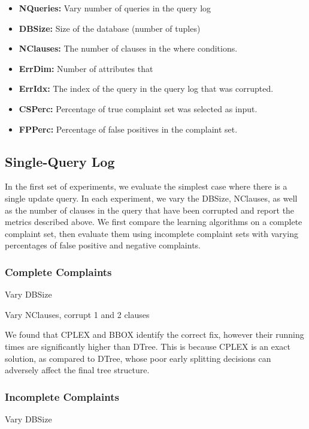 \begin{itemize}
\item {\bf NQueries:} Vary number of queries in the query log
\item {\bf DBSize: } Size of the database (number of tuples)
\item {\bf NClauses:} The number of clauses in the where conditions.
\item {\bf ErrDim: } Number of attributes that 
\item {\bf ErrIdx: } The index of the query in the query log that was corrupted.
\item {\bf CSPerc: } Percentage of true complaint set was selected as input.
\item {\bf FPPerc: } Percentage of false positives in the complaint set.
\end{itemize}


\subsection{Single-Query Log}

In the first set of experiments, we evaluate the simplest case where there
is a single update query.  In each experiment, we vary the DBSize,
NClauses, as well as the number of clauses in the query that have
been corrupted and report the metrics described above.  We first 
compare the learning algorithms on a complete complaint set, then evaluate them
using incomplete complaint sets with varying percentages of false positive and negative complaints.

\subsubsection{Complete Complaints}

Vary DBSize

Vary NClauses, corrupt 1 and 2 clauses

We found that CPLEX and BBOX identify the correct fix, however their
running times are significantly higher than DTree.  This is because
CPLEX is an exact solution, as compared to DTree, whose poor early
splitting decisions can adversely affect the final tree structure.

\subsubsection{Incomplete Complaints}


Vary DBSize

